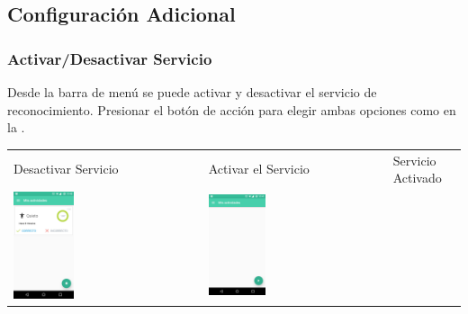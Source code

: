 {\subsection{Configuración Adicional}
\label{config_adic:configuracion-adicional}\label{config_adic:har-conf-advanced}\label{config_adic::doc}

\subsubsection{Activar/Desactivar Servicio}
\label{config_adic:activar-desactivar-servicio}
Desde la barra de menú se puede activar y desactivar el servicio de reconocimiento. Presionar el botón
de acción para elegir ambas opciones como en la .

\begin{table}[!h]
\begin{tabular}{lll}
\textsf{\relax 
Desactivar Servicio
} & \textsf{\relax 
Activar el Servicio
} & \textsf{\relax 
Servicio Activado
}\\
    {\includegraphics[width=0.33\textwidth]{anexos/graphics/disable_serv.jpg}}
 & 
    {\includegraphics[width=0.33\textwidth]{anexos/graphics/enable_serv.jpg}}

\end{tabular}
\end{table}}
